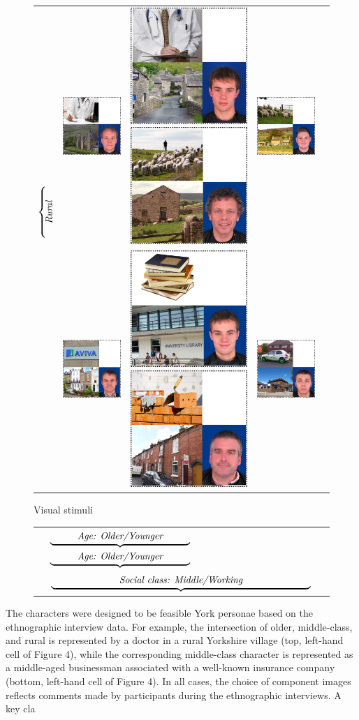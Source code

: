 \documentclass[PWPL]{article}
\begin{document}
\begin{figure}[ht]
\caption{Visual stimuli}
\centering
\begin{tabular}{ccccc}
\multirow{2}{*}{$\rotatebox[origin=t]{90}{$\overbrace{\rule{0.5cm}{0pt}\mathsf{\textit{Rural}}\rule{0.5cm}{0pt}}$\hspace*{-2cm}}$} &\includegraphics[scale=0.25]{M_O_MC_L_1.png} & \includegraphics[scale=0.25]{M_Y_MC_L_1.png} \includegraphics[scale=0.25]{M_O_WC_L_1.png} &\includegraphics[scale=0.25]{M_Y_WC_L_1.png} \\ 
 $\rotatebox[origin=t]{90}{\hspace*{1.5cm}$\overbrace{\rule{0.5cm}{0pt}\mathsf{\textit{Urban}}\rule{0.5cm}{0pt}}$}$
    &\includegraphics[scale=0.25]{M_O_MC_NL_1.png} & \includegraphics[scale=0.25]{M_Y_MC_NL_1.png} \includegraphics[scale=0.25]{M_O_WC_NL_1.png} & \includegraphics[scale=0.25]{M_Y_WC_NL_1.png}\\
\end{tabular}
\vspace*{-1.5cm}
\end{figure}
\begin{figure}[!htpb]
\centering
\begin{tabular}{lllll}


    &\multicolumn{4}{l}{
    $\underbrace{\rule{1cm}{0pt}{\textit{Age: Older/Younger}}\rule{1cm}{0pt}}$$\underbrace{\rule{1cm}{0pt}{\textit{Age: Older/Younger}}\rule{1cm}{0pt}}$}\\

    &\multicolumn{4}{l}{
$\underbrace{\rule{2.5cm}{0pt}{\textit{Social class: Middle/Working}}\rule{2.5cm}{0pt}}$}\\
   \end{tabular}
\end{figure}

The characters were designed to be feasible York personae based on the ethnographic interview data. For example, the intersection of older, middle-class, and rural is represented by a doctor in a rural Yorkshire village (top, left-hand cell of Figure 4), while the corresponding middle-class character is represented as a middle-aged businessman associated with a well-known insurance company (bottom, left-hand cell of Figure 4). In all cases, the choice of component images reflects comments made by participants during the ethnographic interviews. A key cla
\end{document}
